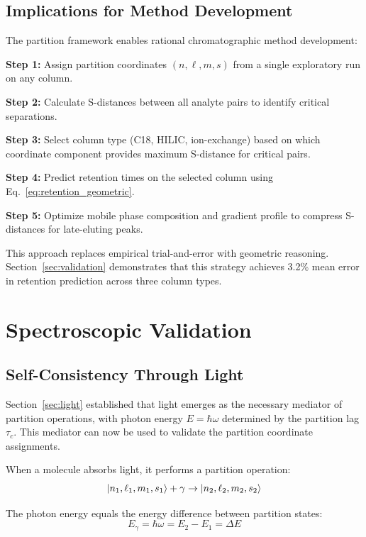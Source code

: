 \documentclass[twocolumn,superscriptaddress,prb,10pt]{revtex4-2}
\begin{document}
\subsection{Implications for Method Development}

The partition framework enables rational chromatographic method development:

\textbf{Step 1:} Assign partition coordinates $(n, \ell, m, s)$ from a single exploratory run on any column.

\textbf{Step 2:} Calculate S-distances between all analyte pairs to identify critical separations.

\textbf{Step 3:} Select column type (C18, HILIC, ion-exchange) based on which coordinate component provides maximum S-distance for critical pairs.

\textbf{Step 4:} Predict retention times on the selected column using Eq.~\ref{eq:retention_geometric}.

\textbf{Step 5:} Optimize mobile phase composition and gradient profile to compress S-distances for late-eluting peaks.

This approach replaces empirical trial-and-error with geometric reasoning. Section~\ref{sec:validation} demonstrates that this strategy achieves 3.2\% mean error in retention prediction across three column types.

\section{Spectroscopic Validation}
\label{sec:spectroscopy}

\subsection{Self-Consistency Through Light}

Section~\ref{sec:light} established that light emerges as the necessary mediator of partition operations, with photon energy $E = \hbar\omega$ determined by the partition lag $\tau_c$. This mediator can now be used to validate the partition coordinate assignments.

When a molecule absorbs light, it performs a partition operation:
\begin{equation}
\ket{n_1, \ell_1, m_1, s_1} + \gamma \to \ket{n_2, \ell_2, m_2, s_2}
\label{eq:absorption}
\end{equation}

The photon energy equals the energy difference between partition states:
\begin{equation}
E_{\gamma} = \hbar\omega = E_2 - E_1 = \Delta E
\label{eq:photon_resonance}
\end{equation}
\end{document}
